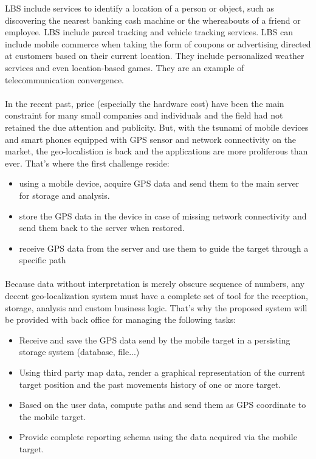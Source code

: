 LBS include services to identify a location of a person or object, such as discovering the nearest banking cash machine or the whereabouts of a friend or employee. LBS include parcel tracking and vehicle tracking services. LBS can include mobile commerce when taking the form of coupons or advertising directed at customers based on their current location. They include personalized weather services and even location-based games. They are an example of telecommunication convergence.\cite{geolocation:wikipidea:lbs}

\paragraph{}
In the recent past, price (especially the hardware cost) have been the main constraint for many small companies and individuals and the field had not retained the due attention and publicity. But, with the tsunami of mobile devices and smart phones equipped with GPS sensor and network connectivity on the market, the geo-localistion is back and the applications are more proliferous than ever. That's where the first challenge reside:
\begin{itemize}
\item using a mobile device, acquire GPS data and send them to the main server for storage and analysis.
\item store the GPS data in the device in case of missing network connectivity and send them back to the server when restored.
\item receive GPS data from the server and use them to guide the target through a specific path
\end{itemize}

\paragraph{}
Because data without interpretation is merely obscure sequence of numbers, any decent geo-localization system must have a complete set of tool for the reception, storage, analysis and custom business logic. That's why the proposed system will be provided with back office for managing the following tasks:
\begin{itemize}
\item Receive and save the GPS data send by the mobile target in a persisting storage system (database, file...)
\item Using third party map data, render a graphical representation of the current target position and the past movements history of one or more target.
\item Based on the user data, compute paths and send them as GPS coordinate to the mobile target.
\item Provide complete reporting schema using the data acquired via the mobile target.
\end{itemize}